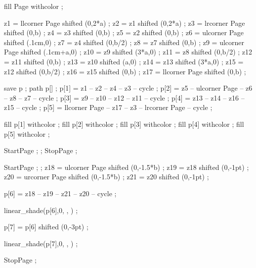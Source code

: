 fill Page withcolor  ;

z1 = llcorner Page shifted (0,2*a) ;
z2 = z1 shifted (0,2*a) ;
z3 = lrcorner Page shifted (0,b) ;
z4 = z3 shifted (0,b) ;
z5 = z2 shifted (0,b) ;
z6 = ulcorner Page  shifted (.1cm,0) ;
z7 = z4 shifted (0,b/2) ;
z8 = z7 shifted (0,b) ;
z9 = ulcorner Page shifted (.1cm+a,0) ;
z10 = z9 shifted (3*a,0) ;
z11 = z8 shifted (0,b/2) ;
z12 = z11 shifted (0,b) ;
z13 = z10 shifted (a,0) ;
z14 = z13 shifted (3*a,0) ;
z15 = z12 shifted (0,b/2) ;
z16 = z15 shifted (0,b) ;
z17 = llcorner Page shifted (0,b) ;

save p ;
path p[] ;
p[1] = z1 -- z2 -- z4 -- z3 -- cycle ;
p[2] = z5 -- ulcorner Page -- z6 -- z8 -- z7 -- cycle ;
p[3] = z9 -- z10 -- z12 -- z11 -- cycle ;
p[4] = z13 -- z14 -- z16 -- z15 -- cycle ;
p[5] = llcorner Page -- z17 -- z3 -- lrcorner Page -- cycle ;

fill p[1] withcolor  ;
fill p[2] withcolor  ;
fill p[3] withcolor  ;
fill p[4] withcolor  ;
fill p[5] withcolor  ;
\stopuseMPgraphic 

StartPage ;
 ;
StopPage ;
\stopuniqueMPgraphic

StartPage ;
 ;
z18 = ulcorner Page shifted (0,-1.5*b) ;
z19 = z18 shifted (0,-1pt) ;
z20 = urcorner Page shifted (0,-1.5*b) ;
z21 = z20 shifted (0,-1pt) ;

p[6] = z18 -- z19 -- z21 -- z20 -- cycle ;

linear_shade(p[6],0,
             ,
             ) ;

p[7] = p[6] shifted (0,-3pt) ;

linear_shade(p[7],0,
             ,
             ) ;

StopPage ;
\stopuniqueMPgraphic




